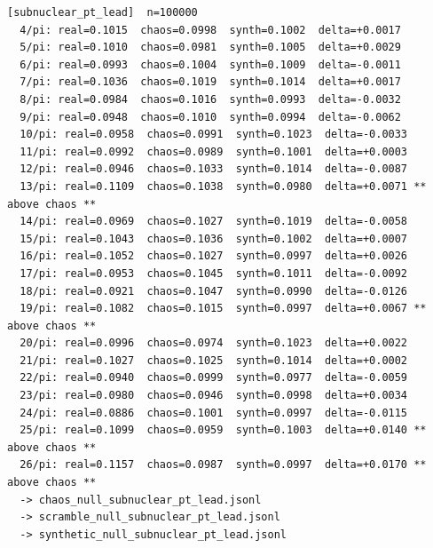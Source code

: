 \documentclass[11pt, letterpaper, openany]{book}
\begin{document}
\begin{empiricalbox}
\begin{lstlisting}[style=terminal]
[subnuclear_pt_lead]  n=100000
  4/pi: real=0.1015  chaos=0.0998  synth=0.1002  delta=+0.0017
  5/pi: real=0.1010  chaos=0.0981  synth=0.1005  delta=+0.0029
  6/pi: real=0.0993  chaos=0.1004  synth=0.1009  delta=-0.0011
  7/pi: real=0.1036  chaos=0.1019  synth=0.1014  delta=+0.0017
  8/pi: real=0.0984  chaos=0.1016  synth=0.0993  delta=-0.0032
  9/pi: real=0.0948  chaos=0.1010  synth=0.0994  delta=-0.0062
  10/pi: real=0.0958  chaos=0.0991  synth=0.1023  delta=-0.0033
  11/pi: real=0.0992  chaos=0.0989  synth=0.1001  delta=+0.0003
  12/pi: real=0.0946  chaos=0.1033  synth=0.1014  delta=-0.0087
  13/pi: real=0.1109  chaos=0.1038  synth=0.0980  delta=+0.0071 ** above chaos **
  14/pi: real=0.0969  chaos=0.1027  synth=0.1019  delta=-0.0058
  15/pi: real=0.1043  chaos=0.1036  synth=0.1002  delta=+0.0007
  16/pi: real=0.1052  chaos=0.1027  synth=0.0997  delta=+0.0026
  17/pi: real=0.0953  chaos=0.1045  synth=0.1011  delta=-0.0092
  18/pi: real=0.0921  chaos=0.1047  synth=0.0990  delta=-0.0126
  19/pi: real=0.1082  chaos=0.1015  synth=0.0997  delta=+0.0067 ** above chaos **
  20/pi: real=0.0996  chaos=0.0974  synth=0.1023  delta=+0.0022
  21/pi: real=0.1027  chaos=0.1025  synth=0.1014  delta=+0.0002
  22/pi: real=0.0940  chaos=0.0999  synth=0.0977  delta=-0.0059
  23/pi: real=0.0980  chaos=0.0946  synth=0.0998  delta=+0.0034
  24/pi: real=0.0886  chaos=0.1001  synth=0.0997  delta=-0.0115
  25/pi: real=0.1099  chaos=0.0959  synth=0.1003  delta=+0.0140 ** above chaos **
  26/pi: real=0.1157  chaos=0.0987  synth=0.0997  delta=+0.0170 ** above chaos **
  -> chaos_null_subnuclear_pt_lead.jsonl
  -> scramble_null_subnuclear_pt_lead.jsonl
  -> synthetic_null_subnuclear_pt_lead.jsonl


\end{lstlisting}
\end{empiricalbox}
\end{document}
